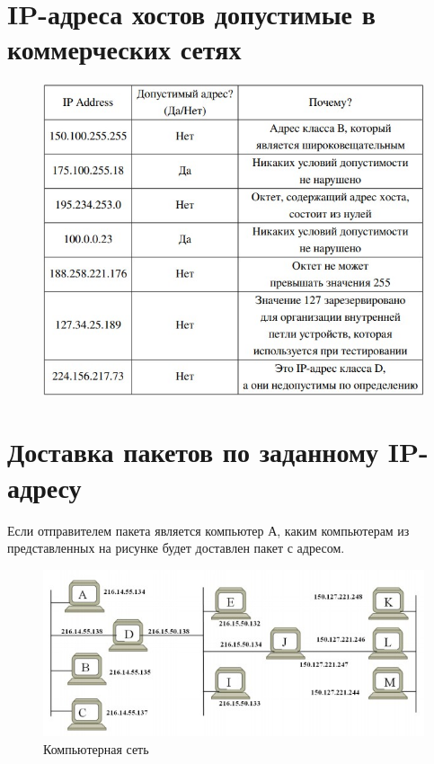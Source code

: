 \documentclass[bachelor, och, labwork]{shiza}
\begin{document}
\section{IP-адреса хостов допустимые в коммерческих сетях}

    \begin{figure}[H]
        \centering      %
        \includegraphics[width=1\textwidth]{3}
        \label{fig:image1}
    \end{figure}

\newpage
\section{Доставка пакетов по заданному IP-адресу}

    Если отправителем пакета является компьютер А, каким компьютерам из представленных на рисунке будет доставлен пакет с адресом.

    \begin{figure}[H]
        \centering
        \includegraphics[width=1\textwidth]{4}
        \caption{Компьютерная сеть}
        \label{fig:img1}
    \end{figure}
\end{document}
